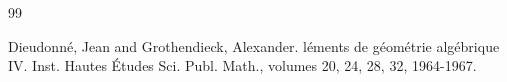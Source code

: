 \documentclass{stacks-project}
\newenvironment{reference}{\comment}{\endcomment}
\theoremstyle{plain}
\theoremstyle{definition}
\theoremstyle{remark}
\numberwithin{equation}{subsection}
\begin{document}
\begin{thebibliography}{99}

Dieudonn{\'e}, Jean and Grothendieck, Alexander.
l\'ements de g\'eom\'etrie alg\'ebrique IV.
\newblock Inst. Hautes \'Etudes Sci. Publ. Math., volumes 20, 24, 28, 32, 1964-1967.

\end{thebibliography}
\end{document}
